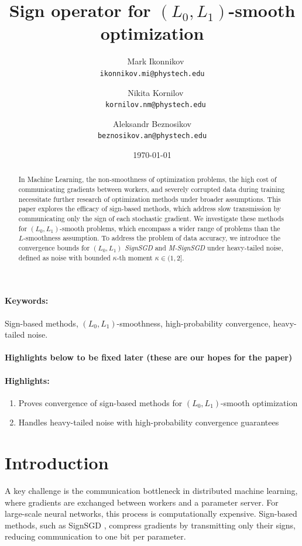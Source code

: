 \documentclass[12pt]{article}
\title{Sign operator for $(L_0, L_1)$-smooth optimization}
\author{
  Mark Ikonnikov\\
  \texttt{ikonnikov.mi@phystech.edu}
  \and
  Nikita Kornilov\\
  \texttt{kornilov.nm@phystech.edu}
  \and Aleksandr Beznosikov\\
  \texttt{beznosikov.an@phystech.edu}
}
\date{\today}
\begin{document}
\maketitle

\begin{abstract}
In Machine Learning, the non-smoothness of optimization problems, the high cost of communicating gradients between workers, and severely corrupted data during training necessitate further research of optimization methods under broader assumptions. This paper explores the efficacy of sign-based methods, which address slow transmission by communicating only the sign of each stochastic gradient. We investigate these methods for $(L_0, L_1)$-smooth problems, which encompass a wider range of problems than the $L$-smoothness assumption. To address the problem of data accuracy, we introduce the convergence bounds for \textit{$(L_0, L_1)$ SignSGD} and \textit{M-SignSGD} under heavy-tailed noise, defined as noise with bounded $\kappa$-th moment $\kappa \in (1,2]$.
\end{abstract}

\paragraph{Keywords:} Sign-based methods, $(L_0, L_1)$-smoothness, high-probability convergence, heavy-tailed noise.

\paragraph{ Highlights below to be fixed later (these are our hopes for the paper)}

\paragraph{ Highlights:}
\begin{enumerate}
\item Proves convergence of sign-based methods for $(L_0, L_1)$-smooth optimization
\item Handles heavy-tailed noise with high-probability convergence guarantees

\end{enumerate}

\section{Introduction}
A key challenge is the communication bottleneck in distributed machine learning, where gradients are exchanged between workers and a parameter server. For large-scale neural networks, this process is computationally expensive. Sign-based methods, such as SignSGD \cite{pmlr-v80-bernstein18a}, compress gradients by transmitting only their signs, reducing communication to one bit per parameter. 
\end{document}
